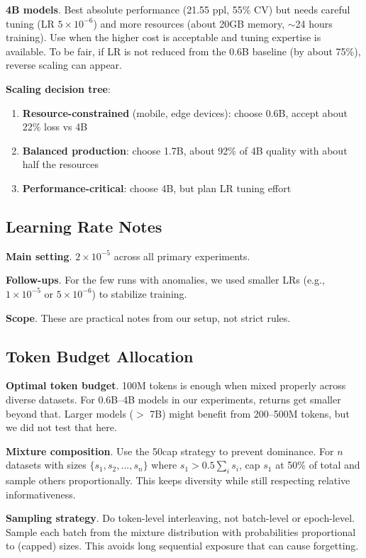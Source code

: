\textbf{4B models}. Best absolute performance (21.55 ppl, 55\% CV) but needs careful tuning (LR $5 \times 10^{-6}$) and more resources (about 20GB memory, $\sim$24 hours training). Use when the higher cost is acceptable and tuning expertise is available. To be fair, if LR is not reduced from the 0.6B baseline (by about 75\%), reverse scaling can appear.

\textbf{Scaling decision tree}:
\begin{enumerate}
\item \textbf{Resource-constrained} (mobile, edge devices): choose 0.6B, accept about 22\% loss vs 4B
\item \textbf{Balanced production}: choose 1.7B, about 92\% of 4B quality with about half the resources
\item \textbf{Performance-critical}: choose 4B, but plan LR tuning effort
\end{enumerate}

\subsection{Learning Rate Notes}

\textbf{Main setting}. $2 \times 10^{-5}$ across all primary experiments.

\textbf{Follow-ups}. For the few runs with anomalies, we used smaller LRs (e.g., $1\times10^{-5}$ or $5\times10^{-6}$) to stabilize training.

\textbf{Scope}. These are practical notes from our setup, not strict rules.

\subsection{Token Budget Allocation}

\textbf{Optimal token budget}. 100M tokens is enough when mixed properly across diverse datasets. For 0.6B--4B models in our experiments, returns get smaller beyond that. Larger models ($>$ 7B) might benefit from 200--500M tokens, but we did not test that here.

\textbf{Mixture composition}. Use the 50cap strategy to prevent dominance. For $n$ datasets with sizes $\{s_1, s_2, ..., s_n\}$ where $s_1 > 0.5 \sum_i s_i$, cap $s_1$ at 50\% of total and sample others proportionally. This keeps diversity while still respecting relative informativeness.

\textbf{Sampling strategy}. Do token-level interleaving, not batch-level or epoch-level. Sample each batch from the mixture distribution with probabilities proportional to (capped) sizes. This avoids long sequential exposure that can cause forgetting.

